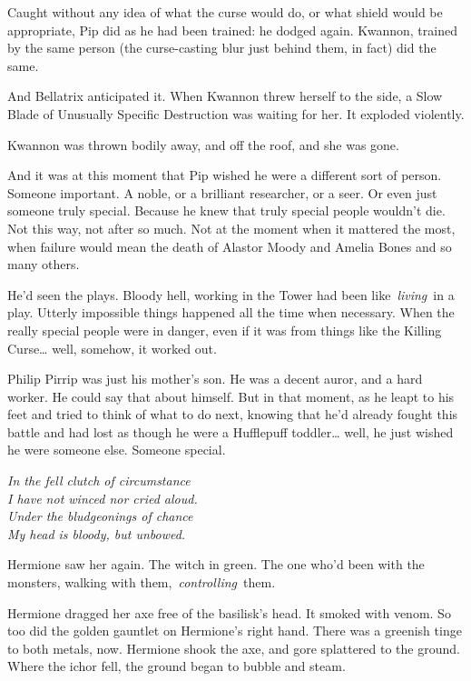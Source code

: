Caught without any idea of what the curse would do, or what shield would
be appropriate, Pip did as he had been trained: he dodged again.
Kwannon, trained by the same person (the curse-casting blur just behind
them, in fact) did the same.

And Bellatrix anticipated it. When Kwannon threw herself to the side, a
Slow Blade of Unusually Specific Destruction was waiting for her. It
exploded violently.

Kwannon was thrown bodily away, and off the roof, and she was gone.

And it was at this moment that Pip wished he were a different sort of
person. Someone important. A noble, or a brilliant researcher, or a
seer. Or even just someone truly special. Because he knew that truly
special people wouldn't die. Not this way, not after so much. Not at the
moment when it mattered the most, when failure would mean the death of
Alastor Moody and Amelia Bones and so many others.

He'd seen the plays. Bloody hell, working in the Tower had been
like~\emph{living}~in a play. Utterly impossible things happened all the
time when necessary. When the really special people were in danger, even
if it was from things like the Killing Curse\ldots{} well, somehow, it
worked out.

Philip Pirrip was just his mother's son. He was a decent auror, and a
hard worker. He could say that about himself. But in that moment, as he
leapt to his feet and tried to think of what to do next, knowing that
he'd already fought this battle and had lost as though he were a
Hufflepuff toddler\ldots{} well, he just wished he were someone else.
Someone special.

\mybreak

\emph{In the fell clutch of circumstance}\\
\emph{I have not winced nor cried aloud.}\\
\emph{Under the bludgeonings of chance}\\
\emph{My head is bloody, but unbowed.}\\

\mybreak

Hermione saw her again. The witch in green. The one who'd been with the
monsters, walking with them,~\emph{controlling}~them.

Hermione dragged her axe free of the basilisk's head. It smoked with
venom. So too did the golden gauntlet on Hermione's right hand. There
was a greenish tinge to both metals, now. Hermione shook the axe, and
gore splattered to the ground. Where the ichor fell, the ground began to
bubble and steam.

